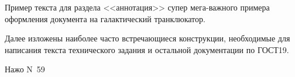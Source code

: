 \annotation

Пример текста для раздела <<аннотация>> супер мега-важного примера оформления документа на галактический транклюкатор.

Далее изложены наиболее часто встречающиеся конструкции, необходимые для написания текста технического задания и остальной документации по ГОСТ19.

Нажо N~59\degree~